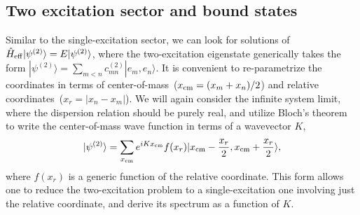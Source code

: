 \documentclass[pra,twocolumn,showpacs,preprintnumbers,amsmath,amssymb]{revtex4-1}
\begin{document}






\subsection{Two excitation sector and bound states}\label{Secarray2ex}

Similar to the single-excitation sector, we can look for solutions of $\hat H_{\rm eff}|\psi^{(2)}\rangle=E|\psi^{(2)}\rangle$, where the two-excitation eigenstate generically takes the form $|\psi^{(2)}\rangle=\sum_{m<n}c^{(2)}_{mn}|e_m,e_n\rangle$. It is convenient to re-parametrize the coordinates in terms of center-of-mass~($x_{\rm cm}=(x_m+x_n)/2$) and relative coordinates~($x_r=|x_n-x_m|$). 
We will again consider the infinite system limit, where the dispersion relation should be purely real, and utilize Bloch's theorem to write the center-of-mass wave function in terms of a wavevector $K$,
\begin{equation}\label{2 ans}
 |\psi^{(2)}\rangle=\sum_{x_{\rm cm}}e^{iKx_{\rm cm}}f(x_r)|x_{\rm cm}-\frac{x_r}{2},x_{\rm cm}+\frac{x_r}{2}\rangle,
\end{equation}
%
where $f(x_r)$ is a generic function of the relative coordinate. This form allows one to reduce the two-excitation problem to a single-excitation one involving just the relative coordinate, and derive its spectrum as a function of $K$.
\end{document}
